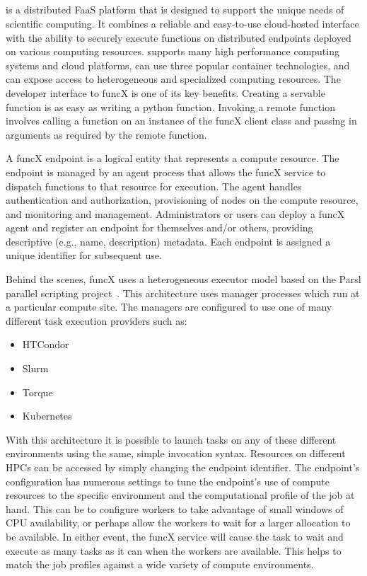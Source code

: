 \subsection{\funcX{}}\label{subsec:funcX}
\funcX{} is a distributed FaaS platform that is designed to support the unique needs of scientific computing. It combines a reliable and easy-to-use cloud-hosted interface with the ability to securely execute functions on distributed endpoints deployed on various computing resources. \funcX{} supports many high performance computing systems and cloud platforms, can use three popular container technologies, and can expose access to heterogeneous and specialized computing resources. The developer interface to funcX is one of its key benefits. Creating a servable function is as easy as writing a python function. Invoking a remote function involves calling a function on an instance of the funcX client class and passing in arguments as required by the remote function.

A funcX endpoint is a logical entity that represents a compute resource. The endpoint is managed by an agent process that allows the funcX service to dispatch functions to that resource for execution. The agent handles authentication and authorization, provisioning of nodes on the compute resource, and monitoring and management. Administrators or users can deploy a funcX agent and register an endpoint for themselves and/or others, providing descriptive (e.g., name, description) metadata. Each endpoint is assigned a unique identifier for subsequent use.

Behind the scenes, funcX uses a heterogeneous executor model based on the Parsl parallel scripting project~\cite{Parsl_paper}.  This architecture uses manager processes which run at a particular compute site. The managers are configured to use one of many different task execution providers such as:
\begin{itemize}
\item HTCondor
\item Slurm
\item Torque
\item Kubernetes
\end{itemize}

With this architecture it is possible to launch tasks on any of these different environments using the same, simple invocation syntax. Resources on different HPCs can be accessed by simply changing the endpoint identifier. The endpoint's configuration has numerous settings to tune the endpoint's use of compute resources to the specific environment and the computational profile of the job at hand. This can be to configure workers to take advantage of small windows of CPU availability, or perhaps allow the workers to wait for a larger allocation to be available. In either event, the funcX service will cause the task to wait and execute as many tasks as it can when the workers are available.  This helps to match the job profiles against a wide variety of compute environments.
